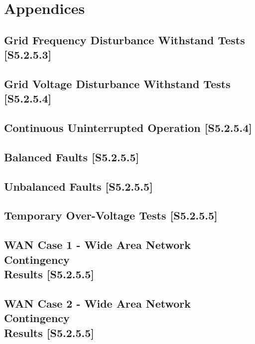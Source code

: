 \documentclass{../grid-link-report}
\begin{document}
	\chapter{Appendices}
	\renewcommand{\thesection}{%
		\AlphAlph{\value{section}}%
	}

	\section{Grid Frequency Disturbance Withstand Tests [S5.2.5.3]}
	\label{Grid Frequency Disturbance Withstand Tests [S5.2.5.3]}
	
	\section{Grid Voltage Disturbance Withstand Tests [S5.2.5.4]}
	\label{Grid Voltage Disturbance Withstand Tests [S5.2.5.4]}
	
	\section{Continuous Uninterrupted Operation [S5.2.5.4]}
	\label{Continuous Uninterrupted Operation [S5.2.5.4]}
	
	\section{Balanced Faults [S5.2.5.5]}
	\label{Balanced Faults [S5.2.5.5]}
	
	\section{Unbalanced Faults [S5.2.5.5]}
	\label{Unbalanced Faults [S5.2.5.5]}
	
	\section{Temporary Over-Voltage Tests [S5.2.5.5]}
	\label{Temporary Over-Voltage Tests [S5.2.5.5]}
	
	\section{WAN Case 1 - Wide Area Network Contingency 
		\\
		Results [S5.2.5.5]}
	\label{WAN Case 1 - Wide Area Network Contingency Results [S5.2.5.5]}
	
	\section{WAN Case 2 - Wide Area Network Contingency 
		\\
		Results [S5.2.5.5]}
	\label{WAN Case 2 - Wide Area Network Contingency Results [S5.2.5.5]}
	
\end{document}

